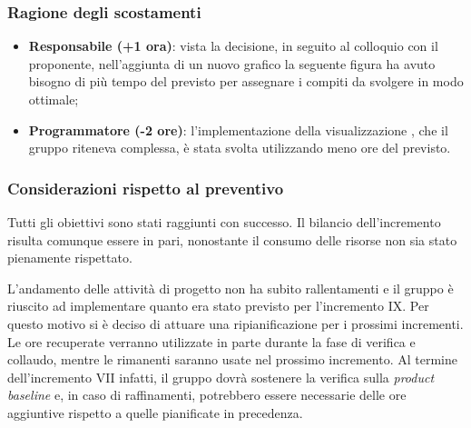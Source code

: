 \subsubsection{Ragione degli scostamenti}

\begin{itemize}
\item \textbf{Responsabile (+1 ora)}: vista la decisione, in seguito al colloquio con il proponente, nell'aggiunta di un nuovo grafico la seguente figura ha avuto bisogno di più tempo del previsto per assegnare i compiti da svolgere in modo ottimale;
\item \textbf{Programmatore (-2 ore)}: l'implementazione della visualizzazione , che il gruppo riteneva complessa, è stata svolta utilizzando meno ore del previsto. 
\end{itemize}

\subsubsection{Considerazioni rispetto al preventivo}
Tutti gli obiettivi sono stati raggiunti con successo. Il bilancio dell'incremento risulta comunque essere in pari, nonostante il consumo delle risorse non sia stato pienamente rispettato.

L'andamento delle attività di progetto non ha subito rallentamenti e il gruppo è riuscito ad implementare quanto era stato previsto per l'incremento IX. Per questo motivo si è deciso di attuare una ripianificazione per i prossimi incrementi. Le ore recuperate verranno utilizzate in parte durante la fase di verifica e collaudo, mentre le rimanenti saranno usate nel prossimo incremento. Al termine dell'incremento VII infatti, il gruppo dovrà sostenere la verifica sulla \textit{product baseline} e, in caso di raffinamenti, potrebbero essere necessarie delle ore aggiuntive rispetto a quelle pianificate in precedenza. 

